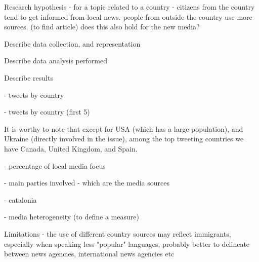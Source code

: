 \documentclass{acm_proc_10ptArticle-sp}
\begin{document}
Research hypothesis - for a topic related to a country - citizens from the country tend to get informed from local news. people from outside the country use more sources. (to find article) does this also hold for the new media?

Describe data collection, and representation

Describe data analysis performed

Describe results

- tweets by country

- tweets by country (first 5)

It is worthy to note that except for USA (which has a large population), and Ukraine (directly involved in the issue), among the top tweeting countries we have Canada, United Kingdom, and Spain. 

- percentage of local media focus

- main parties involved - which are the media sources

- catalonia

- media heterogeneity (to define a measure)

Limitations - the use of different country sources may reflect immigrants, especially when speaking less "popular" languages, probably better to delineate between news agencies, international news agencies etc




\end{document}

